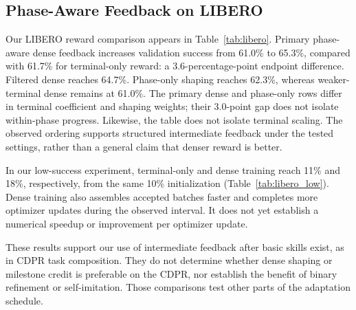 \subsection{Phase-Aware Feedback on LIBERO}\label{sec:libero_results}
Our LIBERO reward comparison appears in Table~\ref{tab:libero}. Primary phase-aware dense feedback increases validation success from 61.0\% to 65.3\%, compared with 61.7\% for terminal-only reward: a 3.6-percentage-point endpoint difference. Filtered dense reaches 64.7\%. Phase-only shaping reaches 62.3\%, whereas weaker-terminal dense remains at 61.0\%. The primary dense and phase-only rows differ in terminal coefficient and shaping weights; their 3.0-point gap does not isolate within-phase progress. Likewise, the table does not isolate terminal scaling. The observed ordering supports structured intermediate feedback under the tested settings, rather than a general claim that denser reward is better.


In our low-success experiment, terminal-only and dense training reach 11\% and 18\%, respectively, from the same 10\% initialization (Table~\ref{tab:libero_low}). Dense training also assembles accepted batches faster and completes more optimizer updates during the observed interval.  It does not yet establish a numerical speedup or improvement per optimizer update.


These results support our use of intermediate feedback after basic skills exist, as in CDPR task composition. They do not determine whether dense shaping or milestone credit is preferable on the CDPR, nor establish the benefit of binary refinement or self-imitation. Those comparisons test other parts of the adaptation schedule.
